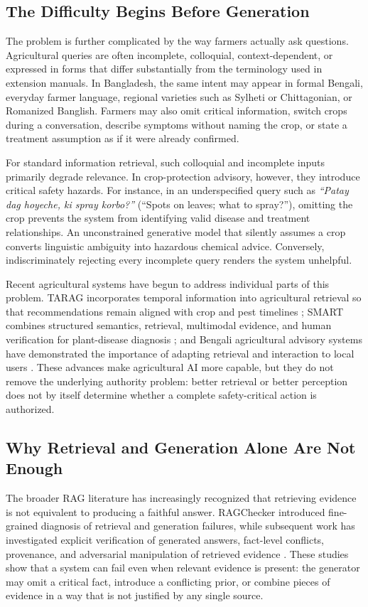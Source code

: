 \documentclass[a4paper,fleqn]{cas-dc}
\begin{document}
\subsection{The Difficulty Begins Before Generation}
The problem is further complicated by the way farmers actually ask questions. Agricultural queries are often incomplete, colloquial, context-dependent, or expressed in forms that differ substantially from the terminology used in extension manuals. In Bangladesh, the same intent may appear in formal Bengali, everyday farmer language, regional varieties such as Sylheti or Chittagonian, or Romanized Banglish. Farmers may also omit critical information, switch crops during a conversation, describe symptoms without naming the crop, or state a treatment assumption as if it were already confirmed.

For standard information retrieval, such colloquial and incomplete inputs primarily degrade relevance. In crop-protection advisory, however, they introduce critical safety hazards. For instance, in an underspecified query such as \emph{``Patay dag hoyeche, ki spray korbo?''} (``Spots on leaves; what to spray?''), omitting the crop prevents the system from identifying valid disease and treatment relationships. An unconstrained generative model that silently assumes a crop converts linguistic ambiguity into hazardous chemical advice. Conversely, indiscriminately rejecting every incomplete query renders the system unhelpful.

Recent agricultural systems have begun to address individual parts of this problem. TARAG incorporates temporal information into agricultural retrieval so that recommendations remain aligned with crop and pest timelines \citep{tarag2026}; SMART combines structured semantics, retrieval, multimodal evidence, and human verification for plant-disease diagnosis \citep{smart2026}; and Bengali agricultural advisory systems have demonstrated the importance of adapting retrieval and interaction to local users \citep{krishokbondhu2025}. These advances make agricultural AI more capable, but they do not remove the underlying authority problem: better retrieval or better perception does not by itself determine whether a complete safety-critical action is authorized.

\subsection{Why Retrieval and Generation Alone Are Not Enough}
The broader RAG literature has increasingly recognized that retrieving evidence is not equivalent to producing a faithful answer. RAGChecker introduced fine-grained diagnosis of retrieval and generation failures, while subsequent work has investigated explicit verification of generated answers, fact-level conflicts, provenance, and adversarial manipulation of retrieved evidence \citep{ragchecker2024,generateverify2025,faithfulrag2025,saferag2025}. These studies show that a system can fail even when relevant evidence is present: the generator may omit a critical fact, introduce a conflicting prior, or combine pieces of evidence in a way that is not justified by any single source.
\end{document}
